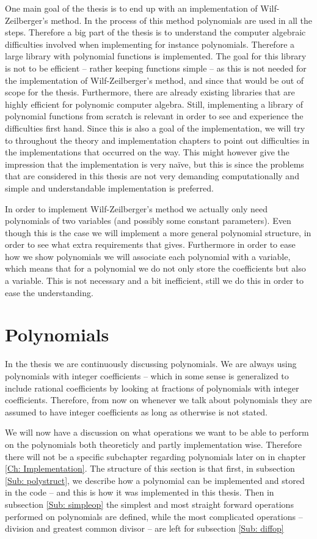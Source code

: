 One main goal of the thesis is to end up with an implementation of Wilf-Zeilberger's method. In the process of this method polynomials are used in all the steps. Therefore a big part of the thesis is to understand the computer algebraic difficulties involved when implementing for instance polynomials. Therefore a large library with polynomial functions is implemented. The goal for this library is not to be efficient -- rather keeping functions simple -- as this is not needed for the implementation of Wilf-Zeilberger's method, and since that would be out of scope for the thesis. Furthermore, there are already existing libraries that are highly efficient for polynomic computer algebra. Still, implementing a library of polynomial functions from scratch is relevant in order to see and experience the difficulties first hand. Since this is also a goal of the implementation, we will try to throughout the theory and implementation chapters to point out difficulties in the implementations that occurred on the way. This might however give the impression that the implementation is very naïve, but this is since the problems that are considered in this thesis are not very demanding computationally and simple and understandable implementation is preferred.

In order to implement Wilf-Zeilberger's method we actually only need polynomials of two variables (and possibly some constant parameters). Even though this is the case we will implement a more general polynomial structure, in order to see what extra requirements that gives. Furthermore in order to ease how we show polynomials we will associate each polynomial with a variable, which means that for a polynomial we do not only store the coefficients but also a variable. This is not necessary and a bit inefficient, still we do this in order to ease the understanding.

\section{Polynomials}
In the thesis we are continuously discussing polynomials. We are always using polynomials with integer coefficients -- which in some sense is generalized to include rational coefficients by looking at fractions of polynomials with integer coefficients. Therefore, from now on whenever we talk about polynomials they are assumed to have integer coefficients as long as otherwise is not stated.

We will now have a discussion on what operations we want to be able to perform on the polynomials both theoreticly and partly implementation wise. Therefore there will not be a specific subchapter regarding polynomials later on in chapter \ref{Ch: Implementation}. The structure of this section is that first, in subsection \ref{Sub: polystruct}, we describe how a polynomial can be implemented and stored in the code -- and this is how it was implemented in this thesis. Then in subsection \ref{Sub: simpleop} the simplest and most straight forward operations performed on polynomials are defined, while the most complicated operations -- division and greatest common divisor -- are left for subsection \ref{Sub: diffop}

